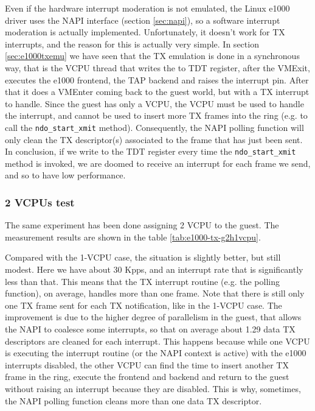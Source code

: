 Even if the hardware interrupt moderation is not emulated, the Linux e1000 driver uses the NAPI interface (section \ref{sec:napi}), so 
a software interrupt
moderation is actually implemented. Unfortunately, it doesn't work for TX interrupts, and the reason for this is actually very simple.
In section \ref{sec:e1000txemu} we have seen that the TX emulation is done in a synchronous way, that is the VCPU thread that writes
the to TDT register, after the VMExit, executes the e1000 frontend, the TAP backend and raises the interrupt pin. After that
it does a VMEnter coming back to the guest world, but with a TX interrupt to handle. Since the guest
has only a VCPU, the VCPU must be used to handle the interrupt, and cannot be used to insert more TX frames into the ring (e.g. to call
the \texttt{ndo\_start\_xmit} method). Consequently, the NAPI polling function will only clean the TX descriptor(s) associated to the
frame that has just been sent.
In conclusion, if we write to the TDT register every time the \texttt{ndo\_start\_xmit} method is invoked, we are doomed to receive
an interrupt for each frame we send, and so to have low performance.


\subsubsection{2 VCPUs test}
The same experiment has been done assigning 2 VCPU to the guest. The measurement results are shown in the table \ref{tab:e1000-tx-g2h1vcpu}.

Compared with the 1-VCPU case, the situation is slightly better, but still modest. Here we have about 30 Kpps, and an interrupt rate
that is significantly less than that. This means that the TX interrupt routine (e.g. the polling function), on average, handles more than
one frame.
Note that there is still only one TX frame sent for each TX notification, like in the 1-VCPU case.
The improvement is due to the higher degree of parallelism in the guest, that allows the NAPI to coalesce some interrupts, so that
on average about 1.29 data TX descriptors are cleaned for each interrupt. This happens because while one VCPU is executing the interrupt
routine (or the NAPI context is active) with the e1000 interrupts disabled, the other VCPU can find the time to insert another TX frame
in the ring, execute the frontend and backend and return to the guest without raising an interrupt because they are disabled.
This is why, sometimes, the NAPI polling function cleans more than one data TX descriptor.


